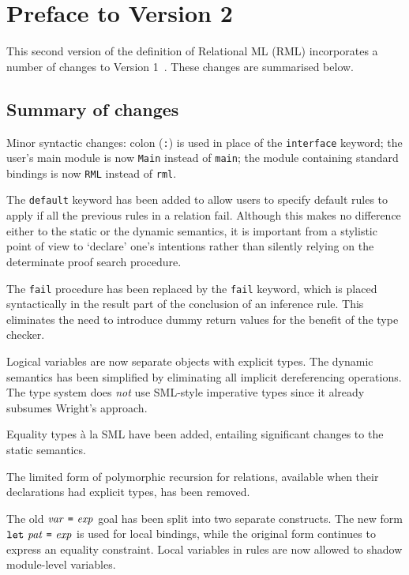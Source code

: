 %
\section*{Preface to Version 2}
This second version of the definition of Relational ML (RML) incorporates
a number of changes to Version 1~\cite[Appendix A]{Pettersson95:thesis}.
These changes are summarised below.

\subsection*{Summary of changes}

Minor syntactic changes:
colon (\texttt{:}) is used in place of the \texttt{interface} keyword;
the user's main module is now \texttt{Main} instead of \texttt{main};
the module containing standard bindings is now \texttt{RML} instead of \texttt{rml}.

The \texttt{default} keyword has been added to allow users to
specify default rules to apply if all the previous rules in a relation fail.
Although this makes no difference either to the static or the dynamic semantics,
it is important from a stylistic point of view to `declare' one's intentions
rather than silently relying on the determinate proof search procedure.

The \texttt{fail} procedure has been replaced by the \texttt{fail} keyword,
which is placed syntactically in the result part of the conclusion of
an inference rule. This eliminates the need to introduce dummy return
values for the benefit of the type checker.

Logical variables are now separate objects with explicit types.
The dynamic semantics has been simplified by eliminating all
implicit dereferencing operations.
The type system does \emph{not} use SML-style imperative types since
it already subsumes Wright's \cite{Wright95} approach.

Equality types {\`a} la SML have been added,
entailing significant changes to the static semantics.

The limited form of polymorphic recursion for relations,
available when their declarations had explicit types, has been removed.

The old $\mbox{\textit{var}}~\mbox{\texttt{=}}~\mbox{\textit{exp}}$ goal has been split into two separate
constructs. The new form $\mbox{\texttt{let}}~\mbox{\textit{pat}}~\mbox{\texttt{=}}~\mbox{\textit{exp}}$ is used for
local bindings, while the original form continues to express an equality constraint.
Local variables in rules are now allowed to shadow module-level variables.

